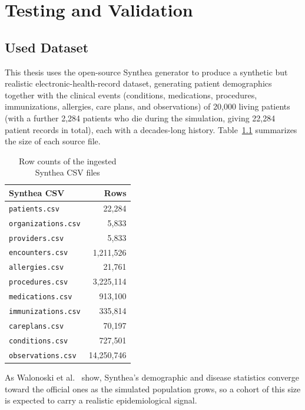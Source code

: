 \chapter{Testing and Validation}
\label{ch:testing}

\section{Used Dataset}
\label{ch:used_dataset}

This thesis uses the open-source Synthea generator to produce a synthetic but realistic electronic-health-record dataset, generating patient demographics together with the clinical events (conditions, medications, procedures, immunizations, allergies, care plans, and observations) of 20{,}000 living patients (with a further 2{,}284 patients who die during the simulation, giving 22{,}284 patient records in total), each with a decades-long history. Table~\ref{tab:ch6_synthea_csv} summarizes the size of each source file.

\begin{table}[H]
\centering
\small
\begin{tabular}{lr}
\hline
\textbf{Synthea CSV} & \textbf{Rows} \\
\hline
\texttt{patients.csv}        &        22,284 \\
\texttt{organizations.csv}   &         5,833 \\
\texttt{providers.csv}       &         5,833 \\
\texttt{encounters.csv}      &     1,211,526 \\
\texttt{allergies.csv}       &        21,761 \\
\texttt{procedures.csv}      &     3,225,114 \\
\texttt{medications.csv}     &       913,100 \\
\texttt{immunizations.csv}   &       335,814 \\
\texttt{careplans.csv}       &        70,197 \\
\texttt{conditions.csv}      &       727,501 \\
\texttt{observations.csv}    &    14,250,746 \\
\hline
\end{tabular}
\caption{Row counts of the ingested Synthea CSV files}
\label{tab:ch6_synthea_csv}
\end{table}

As Walonoski et al.~\cite{walonoski2017} show, Synthea's demographic and disease statistics converge toward the official ones as the simulated population grows, so a cohort of this size is expected to carry a realistic epidemiological signal.


